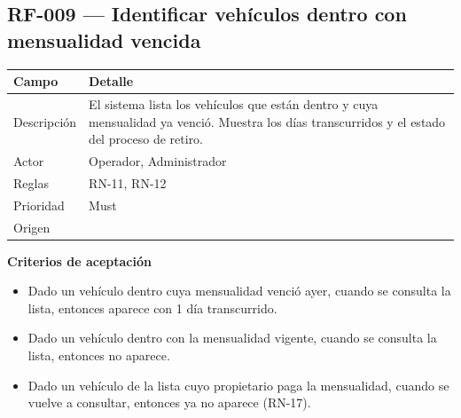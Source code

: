 \subsection{RF-009 — Identificar vehículos dentro con mensualidad vencida}
\begin{longtable}{>{\raggedright\arraybackslash}p{3.2cm}>{\raggedright\arraybackslash}p{11.2cm}}
\toprule
\textbf{Campo} & \textbf{Detalle}\\
\midrule\endhead
Descripción & El sistema lista los vehículos que están dentro y cuya mensualidad ya venció. Muestra los días transcurridos y el estado del proceso de retiro.\\
Actor & Operador, Administrador\\
Reglas & RN-11, RN-12\\
Prioridad & Must\\
Origen & [U]\\
\bottomrule
\end{longtable}

\textbf{Criterios de aceptación}
\begin{itemize}
  \item Dado un vehículo dentro cuya mensualidad venció ayer, cuando se consulta la lista, entonces aparece con 1 día transcurrido.
  \item Dado un vehículo dentro con la mensualidad vigente, cuando se consulta la lista, entonces no aparece.
  \item Dado un vehículo de la lista cuyo propietario paga la mensualidad, cuando se vuelve a consultar, entonces ya no aparece (RN-17).
\end{itemize}


